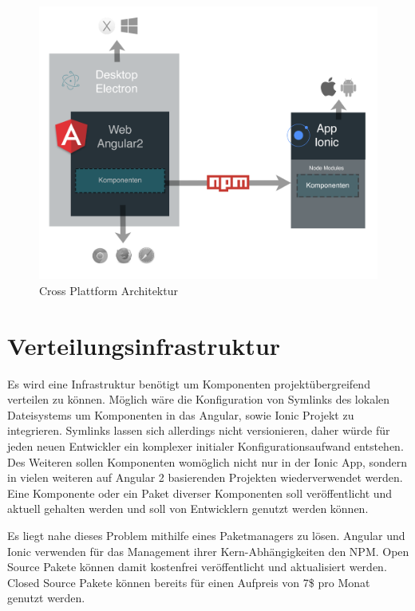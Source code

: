 \begin{figure}[h]
 \centering
 \includegraphics[width=\linewidth]{kapitel4/arch.png}
 \caption{Cross Plattform Architektur}
 \label{kapitel4/arch}
\end{figure}
\vspace{0.3cm}


\section{Verteilungsinfrastruktur}

Es wird eine Infrastruktur benötigt um Komponenten projektübergreifend verteilen zu können.
Möglich wäre die Konfiguration von Symlinks des lokalen Dateisystems um Komponenten in das Angular,
sowie Ionic Projekt zu integrieren. Symlinks lassen sich allerdings nicht versionieren, daher würde
für jeden neuen Entwickler ein komplexer initialer Konfigurationsaufwand entstehen.
Des Weiteren sollen Komponenten womöglich nicht nur in der Ionic App,
sondern in vielen weiteren auf Angular 2 basierenden Projekten wiederverwendet werden.
Eine Komponente oder ein Paket diverser Komponenten soll veröffentlicht und aktuell
gehalten werden und soll von Entwicklern genutzt werden können.

Es liegt nahe dieses Problem mithilfe eines Paketmanagers zu lösen. Angular und Ionic verwenden für das Management
ihrer Kern-Abhängigkeiten den \ac{NPM}.
Open Source Pakete können damit kostenfrei veröffentlicht und aktualisiert werden. Closed Source Pakete können
bereits für einen Aufpreis von 7\$ pro Monat genutzt werden.

